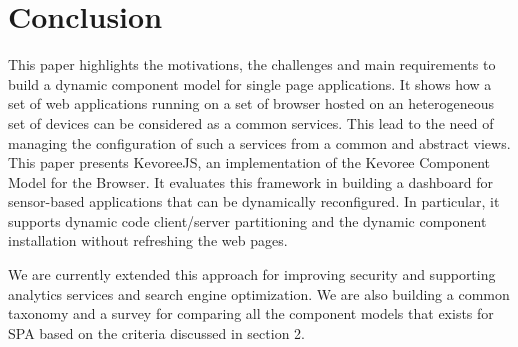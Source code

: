 \section{Conclusion}
This paper highlights the motivations, the challenges and main requirements to build a dynamic component model for single page applications. It shows how a set of web applications running on a set of browser hosted on an heterogeneous set of devices can be considered as a common services. This lead to the need of managing the configuration of such a services from a common and abstract views. This paper presents KevoreeJS, an implementation of the Kevoree Component Model for the Browser. It evaluates this framework in building a dashboard for sensor-based applications that can be dynamically reconfigured. In particular, it supports dynamic code client/server partitioning and the dynamic component installation without refreshing the web pages.  

We are currently extended this approach for improving security and supporting analytics services and search engine optimization. We are also building a common taxonomy and a survey for comparing all the component models that exists for SPA based on the criteria discussed in section 2.